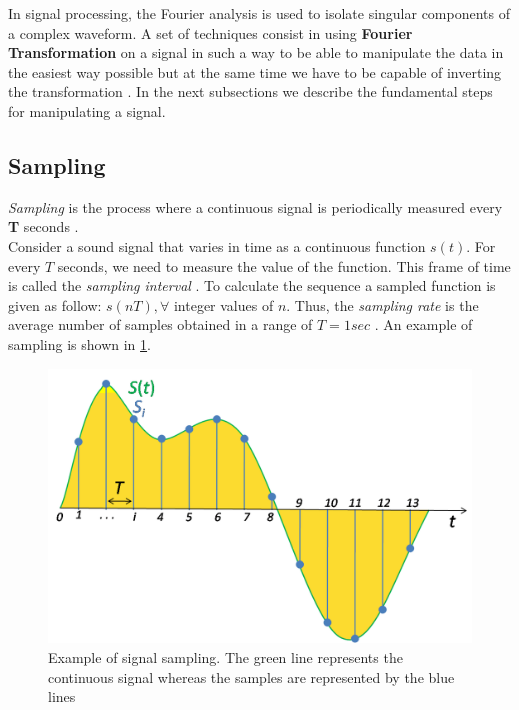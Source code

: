 \noindent In signal processing, the Fourier analysis is used to isolate singular components of a complex waveform. A set of techniques consist in using \textbf{Fourier Transformation} on a signal in such a way to be able to manipulate the data in the easiest way possible but at the same time we have to be capable of inverting the transformation \cite{rabiner1975theory}. In the next subsections we describe the fundamental steps for manipulating a signal.

\subsection{Sampling}
\label{ssubs:sampling}

\textit{Sampling} is the process where a continuous signal is periodically measured every \textbf{T} seconds \cite{orfanidis1995introduction}. \\
\noindent Consider a sound signal that varies in time as a continuous function $s(t)$. For every $T$ seconds, we need to measure the value of the function. This frame of time is called the \textit{sampling interval} \cite{weik2012communications}. To calculate the sequence a sampled function is given as follow: $s(nT), \forall$ integer values of $n$. Thus, the \textit{sampling rate} is the average number of samples obtained in a range of $T = 1sec$ \cite{sampling_wiki}. An example of sampling is shown in \ref{fig:sampling_ex}.

\begin{figure}[!ht]
	\centering
	\includegraphics[scale=0.2]{Figures/sampling_example.png}
	\caption{Example of signal sampling. The green line represents the continuous signal whereas the samples are represented by the blue lines \cite{sampling_wiki}}
	\label{fig:sampling_ex}
\end{figure}

